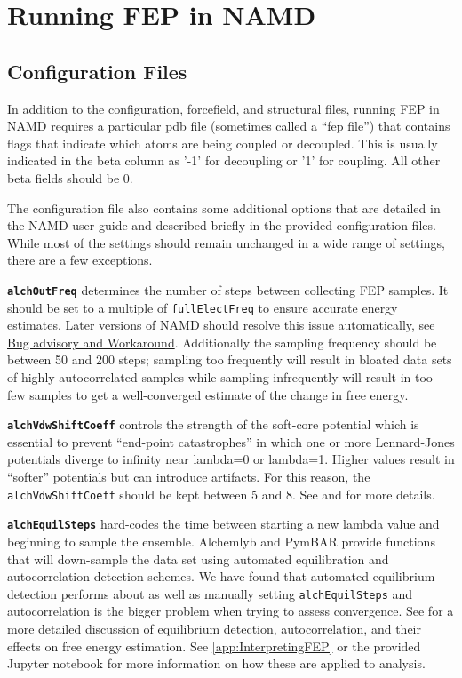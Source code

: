 \documentclass[9pt,tutorial]{Styling/livecoms}
\newcommand{\textInput}[1]{
  \texttt{#1}
}
\begin{document}
\section{Running FEP in NAMD}\label{app:FEPparameters}
\subsection{Configuration Files}
In addition to the configuration, forcefield, and structural files, running FEP in NAMD requires a particular pdb file (sometimes called a ``fep file'') that contains flags that indicate which atoms are being coupled or decoupled. This is usually indicated in the beta column as '-1' for decoupling or '1' for coupling. All other beta fields should be 0.

The configuration file also contains some additional options that are detailed in the NAMD user guide \cite{Bernardi2020} and described briefly in the provided configuration files. While most of the settings should remain unchanged in a wide range of settings, there are a few exceptions.

\textbf{\textInput{alchOutFreq}} determines the number of steps between collecting FEP samples. It should be set to a multiple of \textInput{fullElectFreq} to ensure accurate energy estimates. Later versions of NAMD should resolve this issue automatically, see \href{https://www.ks.uiuc.edu/Research/namd/mailing_list/namd-l.2020-2021/1487.html}{Bug advisory and Workaround}. Additionally the sampling frequency should be between 50 and 200 steps; sampling too frequently will result in bloated data sets of highly autocorrelated samples while sampling infrequently will result in too few samples to get a well-converged estimate of the change in free energy.

\textbf{\textInput{alchVdwShiftCoeff}} controls the strength of the soft-core potential which is essential to prevent “end-point catastrophes” in which one or more Lennard-Jones potentials diverge to infinity near lambda=0 or lambda=1. Higher values result in ``softer'' potentials but can introduce artifacts. For this reason, the \textInput{alchVdwShiftCoeff} should be kept between 5 and 8. See \cite{Zacharias1994} and \cite{Ebrahimi2022} for more details.

\textbf{\textInput{alchEquilSteps}} hard-codes the time between starting a new lambda value and beginning to sample the ensemble. Alchemlyb and PymBAR provide functions that will down-sample the data set using automated equilibration and autocorrelation detection schemes. We have found that automated equilibrium detection performs about as well as manually setting \textInput{alchEquilSteps} and autocorrelation is the bigger problem when trying to assess convergence. See \cite{shirts2008statistically} for a more detailed discussion of equilibrium detection, autocorrelation, and their effects on free energy estimation. See \ref{app:InterpretingFEP} or the provided Jupyter notebook for more information on how these are applied to analysis.
\end{document}
